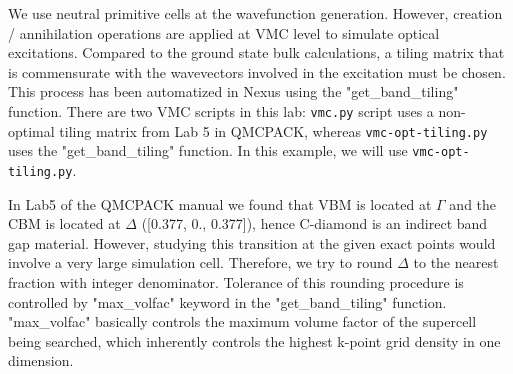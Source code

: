 \documentclass[oneside,11pt]{memoir}
\numberwithin{equation}{section}
\begin{document}
We use neutral primitive cells at the wavefunction generation. However, creation / annihilation operations are applied at VMC level to simulate optical excitations. Compared to the ground state bulk calculations, a tiling matrix that is commensurate with the wavevectors involved in the excitation must be chosen. This process has been automatized in Nexus using the "get\_band\_tiling" function. There are two VMC scripts in this lab: \texttt{vmc.py} script uses a non-optimal tiling matrix from Lab 5 in QMCPACK, whereas \texttt{vmc-opt-tiling.py} uses the  "get\_band\_tiling" function. In this example, we will use \texttt{vmc-opt-tiling.py}. 

In Lab5 of the QMCPACK manual we found that VBM is located at $\Gamma$ and the CBM is located at $\Delta$ ([0.377, 0., 0.377]), hence C-diamond is an indirect band gap material. However, studying this transition at the given exact points would involve a very large simulation cell. Therefore, we try to round $\Delta$ to the nearest fraction with integer denominator. Tolerance of this rounding procedure is controlled by "max\_volfac" keyword in the "get\_band\_tiling" function. "max\_volfac" basically controls the maximum volume factor of the supercell being searched, which inherently controls the highest k-point grid density in one dimension. 
\end{document}
